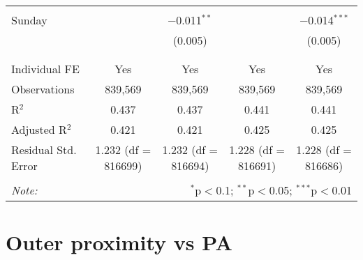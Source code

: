 \documentclass[
]{article}
\begin{document}
\begin{table}[!htbp]
{\begin{tabular}{@{\extracolsep{5pt}}lcccc}
  & & & & \\ 
 Sunday &  & $-$0.011$^{**}$ &  & $-$0.014$^{***}$ \\ 
  &  & (0.005) &  & (0.005) \\ 
  & & & & \\ 
\hline \\[-1.8ex] 
Individual FE & Yes & Yes & Yes & Yes \\ 
Observations & 839,569 & 839,569 & 839,569 & 839,569 \\ 
R$^{2}$ & 0.437 & 0.437 & 0.441 & 0.441 \\ 
Adjusted R$^{2}$ & 0.421 & 0.421 & 0.425 & 0.425 \\ 
Residual Std. Error & 1.232 (df = 816699) & 1.232 (df = 816694) & 1.228 (df = 816691) & 1.228 (df = 816686) \\ 
\hline 
\hline \\[-1.8ex] 
\textit{Note:}  & \multicolumn{4}{r}{$^{*}$p$<$0.1; $^{**}$p$<$0.05; $^{***}$p$<$0.01} \\ 
\end{tabular}
} 
\end{table} 
\newpage
\section{Outer proximity vs PA}
\end{document}
